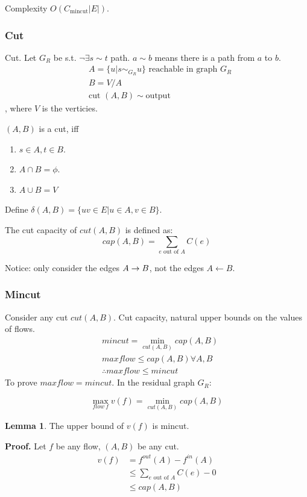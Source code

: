 \documentclass[a4paper]{report}
\theoremstyle{definition}
\newtheorem{lem}{Lemma}[section]
\begin{document}
Complexity $O(C_{\text{mincut}}|E|)$.
\subsubsection{Cut}
Cut. Let $G_R$ be s.t. $\neg \exists s \sim t$ path. $a \sim b$ means there is a path from $a$ to $b$. 
\begin{align*}
& A = \{u| s\sim_{G_R} u\} \text{ reachable in graph $G_R$}\\
& B = V/A\\
& \text{cut } (A, B) \sim \text{output}
\end{align*}
, where $V$ is the verticies.

$(A, B)$ is a cut, iff
\begin{enumerate}
\item $s\in A, t\in B$.
\item $A\cap B = \phi$.
\item $A\cup B = V$
\end{enumerate}
Define $\delta(A,B)=\{uv\in E| u\in A, v\in B\}$.

The cut capacity of $cut(A,B)$ is defined as:
$$
cap(A, B) = \sum_{e \text{ out of }A}C(e)
$$

Notice: only consider the edges $A\rightarrow B$, not the edges $A \leftarrow B$.

\subsubsection{Mincut}
Consider any cut $cut(A,B)$. Cut capacity, natural upper bounds on the values of flows.
\begin{align*}
& mincut = \min_{cut(A,B)} cap(A, B)\\
& maxflow \leq cap(A, B) \forall A, B \\
& \therefore maxflow \leq mincut
\end{align*}
To prove $maxflow = mincut$. In the residual graph $G_R$:

$$
\max_{flow~f} v(f) = \min_{cut(A, B)} cap(A,B)
$$

\begin{lem}
The upper bound of $v(f)$ is mincut.
\end{lem}

\textbf{Proof.} Let $f$ be any flow, $(A,B)$ be any cut.
\begin{align*}
v(f) &= f^{out}(A)-f^{in}(A) \\
&\leq \sum_{e \text{ out of }A}C(e) - 0\\
&\leq cap(A, B) \\
\end{align*}
\end{document}
